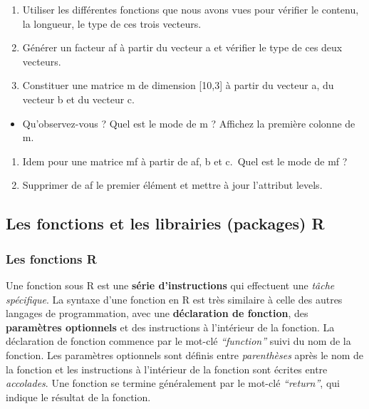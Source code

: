 \documentclass[
]{article}
\providecommand{\tightlist}{%
  \setlength{\itemsep}{0pt}\setlength{\parskip}{0pt}}
\begin{document}
\begin{enumerate}
\def\labelenumi{\arabic{enumi}.}
\setcounter{enumi}{1}
\item
  Utiliser les différentes fonctions que nous avons vues pour vérifier le contenu, la longueur, le type de ces trois vecteurs.
\item
  Générer un facteur af à partir du vecteur a et vérifier le type de ces deux vecteurs.
\item
  Constituer une matrice m de dimension {[}10,3{]} à partir du vecteur a, du vecteur b et du vecteur c.
\end{enumerate}

\begin{itemize}
\tightlist
\item
  Qu'observez-vous ? Quel est le mode de m ? Affichez la première colonne de m.
\end{itemize}

\begin{enumerate}
\def\labelenumi{\arabic{enumi}.}
\setcounter{enumi}{4}
\item
  Idem pour une matrice mf à partir de af, b et c.~Quel est le mode de mf ?
\item
  Supprimer de af le premier élément et mettre à jour l'attribut levels.
\end{enumerate}

\hypertarget{les-fonctions-et-les-librairies-packages-r}{%
\subsection{Les fonctions et les librairies (packages) R}\label{les-fonctions-et-les-librairies-packages-r}}

\hypertarget{les-fonctions-r}{%
\subsubsection{Les fonctions R}\label{les-fonctions-r}}

Une fonction sous R est une \textbf{série d'instructions} qui effectuent une \emph{tâche spécifique}. La syntaxe d'une fonction en R est très similaire à celle des autres langages de programmation, avec une \textbf{déclaration de fonction}, des \textbf{paramètres optionnels} et des instructions à l'intérieur de la fonction. La déclaration de fonction commence par le mot-clé \emph{``function''} suivi du nom de la fonction. Les paramètres optionnels sont définis entre \emph{parenthèses} après le nom de la fonction et les instructions à l'intérieur de la fonction sont écrites entre \emph{accolades}. Une fonction se termine généralement par le mot-clé \emph{``return''}, qui indique le résultat de la fonction.
\end{document}
